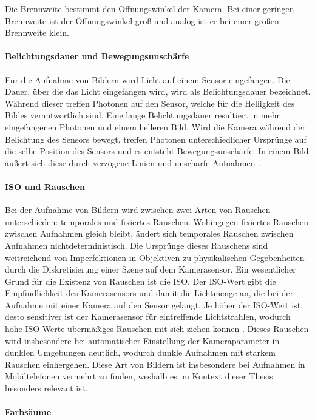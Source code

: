 Die Brennweite bestimmt den Öffnungswinkel der Kamera. Bei einer geringen Brennweite ist der Öffnungswinkel groß und analog ist er bei einer großen Brennweite klein.

\paragraph{Belichtungsdauer und Bewegungsunschärfe}

Für die Aufnahme von Bildern wird Licht auf einem Sensor eingefangen. Die Dauer, über die das Licht eingefangen wird, wird als Belichtungsdauer bezeichnet. Während dieser treffen Photonen auf den Sensor, welche für die Helligkeit des Bildes verantwortlich sind. Eine lange Belichtungsdauer resultiert in mehr eingefangenen Photonen und einem helleren Bild. Wird die Kamera während der Belichtung des Sensors bewegt, treffen Photonen unterschiedlicher Ursprünge auf die selbe Position des Sensors und es entsteht Bewegungsunschärfe. In einem Bild äußert sich diese durch verzogene Linien und unscharfe Aufnahmen \cite{motion_blur}.

\paragraph{ISO und Rauschen}

Bei der Aufnahme von Bildern wird zwischen zwei Arten von Rauschen unterschieden: temporales und fixiertes Rauschen. Wohingegen fixiertes Rauschen zwischen Aufnahmen gleich bleibt, ändert sich temporales Rauschen zwischen Aufnahmen nichtdeterministisch. Die Ursprünge dieses Rauschens sind weitreichend von Imperfektionen in Objektiven zu physikalischen Gegebenheiten durch die Diskretisierung einer Szene auf dem Kamerasensor. Ein wesentlicher Grund für die Existenz von Rauschen ist die ISO. Der ISO-Wert gibt die Empfindlichkeit des Kamerasensors und damit die Lichtmenge an, die bei der Aufnahme mit einer Kamera auf den Sensor gelangt. Je höher der ISO-Wert ist, desto sensitiver ist der Kamerasensor für eintreffende Lichtstrahlen, wodurch hohe ISO-Werte übermäßiges Rauschen mit sich ziehen können \cite{camera_everything}. Dieses Rauschen wird insbesondere bei automatischer Einstellung der Kameraparameter in dunklen Umgebungen deutlich, wodurch dunkle Aufnahmen mit starkem Rauschen einhergehen. Diese Art von Bildern ist insbesondere bei Aufnahmen in Mobiltelefonen vermehrt zu finden, weshalb es im Kontext dieser Thesis besonders relevant ist.

\paragraph{Farbsäume}


